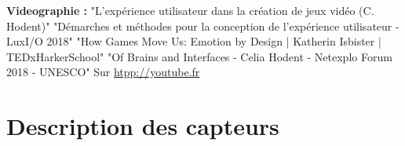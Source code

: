 \documentclass[11pt]{article}
\begin{document}
\hspace*{-1cm}
\Large{\textbf{Videographie :}}\newline
	"L'expérience utilisateur dans la création de jeux vidéo (C. Hodent)"\newline
	"Démarches et méthodes pour la conception de l'expérience utilisateur - LuxI/O 2018"\newline
	"How Games Move Us: Emotion by Design | Katherin Isbister | TEDxHarkerSchool"\newline
	"Of Brains and Interfaces - Celia Hodent - Netexplo  Forum 2018 - UNESCO"
	Sur \href{http://youtube.fr}{htpp://youtube.fr}\par

\newpage
\appendix
\renewcommand{\appendixpagename}{Annexes}\appendixpage
%	

\section{Description des capteurs}
	
\end{document}
